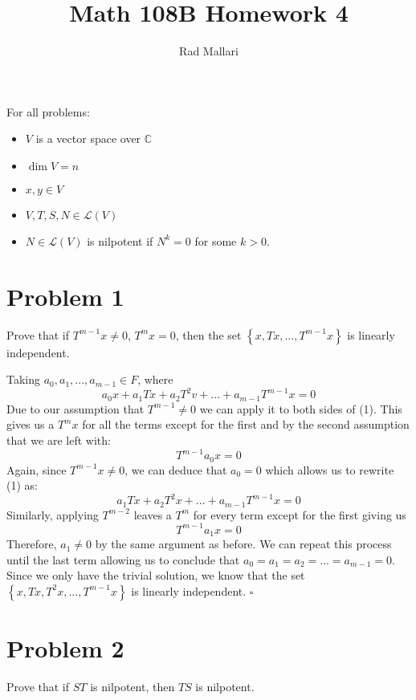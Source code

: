 \documentclass[12pt]{article}
\title{Math 108B Homework 4}
\author{Rad Mallari}
\newcommand{\C}{\mathbb{C}}
\newcommand{\set}[1]{\left\{ #1\right\}}
\newenvironment{proof}{\noindent{\bf Proof.}}{\hfill $\square$\medskip}
\begin{document}
\maketitle
For all problems:
\begin{itemize}
    \setlength{\itemindent}{2em}
    \item $V$ is a vector space over $\C$
    \item $\dim V=n$
    \item $x,y\in V$
    \item $V,T,S,N\in\mathcal{L}(V)$
    \item $N\in\mathcal{L}(V)$ is nilpotent if $N^{k}=0$ for some $k>0$.
\end{itemize}

\section{Problem 1}
Prove that if $T^{m-1}x\neq 0$, $T^{m}x=0$, then the set $\set{x,Tx,...,T^{m-1}x}$ is linearly independent.

\begin{proof}
Taking $a_{0},a_{1},...,a_{m-1}\in F$, where 
\begin{equation}
    a_{0}x+a_{1}Tx+a_{2}T^{2}v+...+a_{m-1}T^{m-1}x=0
\end{equation}
Due to our assumption that $T^{m-1}\neq0$ we can apply it to both sides of (1). This gives us a $T^{m}x$ for all the terms except for the first and by the second assumption that we are left with:
$$T^{m-1}a_{0}x=0$$
Again, since $T^{m-1}x\neq0$, we can deduce that $a_{0}=0$ which allows us to rewrite (1) as:
\begin{equation}
    a_{1}Tx+a_{2}T^{2}x+...+a_{m-1}T^{m-1}x=0
\end{equation}
Similarly, applying $T^{m-2}$ leaves a $T^{m}$ for every term except for the first giving us
$$T^{m-1}a_{1}x=0$$
Therefore, $a_{1}\neq0$ by the same argument as before. We can repeat this process until the last term allowing us to conclude that $a_{0}=a_{1}=a_{2}=...=a_{m-1}=0$. Since we only have the trivial solution, we know that the set $\set{x,Tx,T^{2}x,...,T^{m-1}x}$ is linearly independent.
\end{proof}


\section{Problem 2}
Prove that if $ST$ is nilpotent, then $TS$ is nilpotent.
\end{document}
